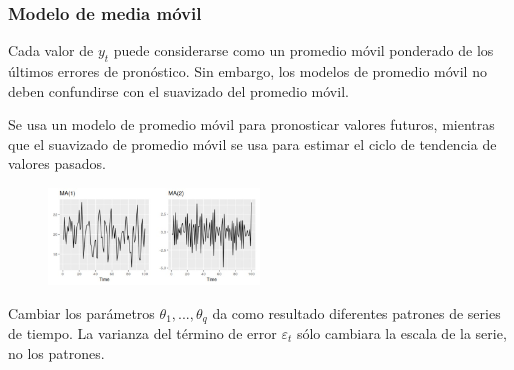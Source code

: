 \documentclass[10pt]{beamer}
\begin{document}



\begin{frame}[fragile]
\frametitle{Modelo de media móvil}

{\small
Cada valor de $y_t$ puede considerarse como un promedio móvil ponderado de los últimos errores de pronóstico. Sin embargo, los modelos de promedio móvil no deben confundirse con el suavizado del promedio móvil.

\vspace{4mm}

Se usa un modelo de promedio móvil para pronosticar valores futuros, mientras que el suavizado de promedio móvil se usa para estimar el ciclo de tendencia de valores pasados.
}
\begin{figure}
\begin{center}
    \includegraphics[width=0.5\textwidth]{Imagen10.JPG}
\end{center}
\end{figure}

\pause
{\small
Cambiar los parámetros $\theta_1, ..., \theta_q$ da como resultado diferentes patrones de series de tiempo. La varianza del término de error $\varepsilon_t$ sólo cambiara la escala de la serie, no los patrones.
}
\end{frame}


\end{document}
